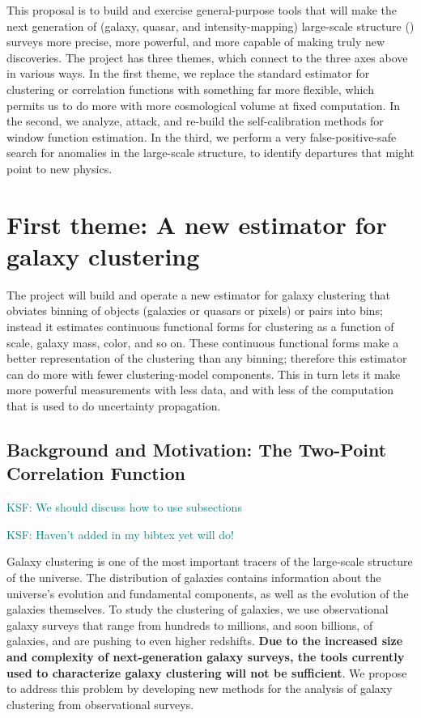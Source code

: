 \documentclass[12pt, fullpage, letterpaper]{article}
\newcommand{\KSF}[1]{\textcolor{teal}{KSF: #1}}
\begin{document}
This proposal is to build and exercise general-purpose tools that will
make the next generation of (galaxy, quasar, and intensity-mapping)
large-scale structure (\LSS) surveys more precise, more powerful, and
more capable of making truly new discoveries.
The project has three themes, which connect to the three axes above in
various ways.
In the first theme, we replace the standard estimator for clustering or
correlation functions with something far more flexible, which permits us
to do more with more cosmological volume at fixed computation.
In the second, we analyze, attack, and re-build the self-calibration 
methods for window function estimation.
In the third, we perform a very false-positive-safe search for anomalies
in the large-scale structure, to identify departures that might point to
new physics.

\section{First theme: A new estimator for galaxy clustering}

The project will build and operate a new estimator for
galaxy clustering that obviates binning of objects (galaxies or
quasars or pixels) or pairs into bins; instead it estimates continuous
functional forms for clustering as a function of scale, galaxy mass,
color, and so on.
These continuous functional forms make a better representation of the
clustering than any binning; therefore this estimator can do more with
fewer clustering-model components.
This in turn lets it make more powerful measurements with less data,
and with less of the computation that is used to do uncertainty
propagation.


\subsection{Background and Motivation: The Two-Point Correlation Function}

\KSF{We should discuss how to use subsections}

\KSF{Haven't added in my bibtex yet will do!}

Galaxy clustering is one of the most important tracers of the large-scale structure of the universe.
The distribution of galaxies contains information about the universe's evolution and fundamental components, as well as the evolution of the galaxies themselves.
To study the clustering of galaxies, we use observational galaxy surveys that range from hundreds to millions, and soon billions, of galaxies, and are pushing to even higher redshifts.
\textbf{Due to the increased size and complexity of next-generation galaxy surveys, the tools currently used to characterize galaxy clustering will not be sufficient}.
We propose to address this problem by developing new methods for the analysis of galaxy clustering from observational surveys.
\end{document}
